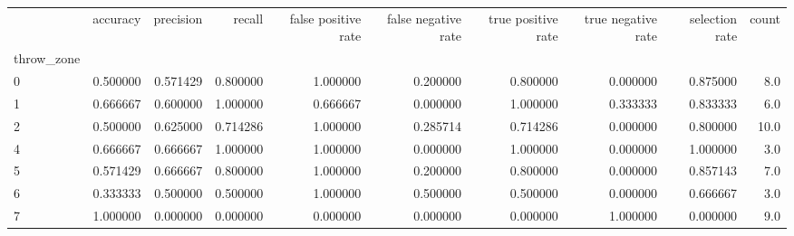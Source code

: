 \begin{tabular}{lrrrrrrrrr}
\toprule
{} &  accuracy &  precision &    recall &  false positive rate &  false negative rate &  true positive rate &  true negative rate &  selection rate &  count \\
throw\_zone &           &            &           &                      &                      &                     &                     &                 &        \\
\midrule
0          &  0.500000 &   0.571429 &  0.800000 &             1.000000 &             0.200000 &            0.800000 &            0.000000 &        0.875000 &    8.0 \\
1          &  0.666667 &   0.600000 &  1.000000 &             0.666667 &             0.000000 &            1.000000 &            0.333333 &        0.833333 &    6.0 \\
2          &  0.500000 &   0.625000 &  0.714286 &             1.000000 &             0.285714 &            0.714286 &            0.000000 &        0.800000 &   10.0 \\
4          &  0.666667 &   0.666667 &  1.000000 &             1.000000 &             0.000000 &            1.000000 &            0.000000 &        1.000000 &    3.0 \\
5          &  0.571429 &   0.666667 &  0.800000 &             1.000000 &             0.200000 &            0.800000 &            0.000000 &        0.857143 &    7.0 \\
6          &  0.333333 &   0.500000 &  0.500000 &             1.000000 &             0.500000 &            0.500000 &            0.000000 &        0.666667 &    3.0 \\
7          &  1.000000 &   0.000000 &  0.000000 &             0.000000 &             0.000000 &            0.000000 &            1.000000 &        0.000000 &    9.0 \\
\bottomrule
\end{tabular}

